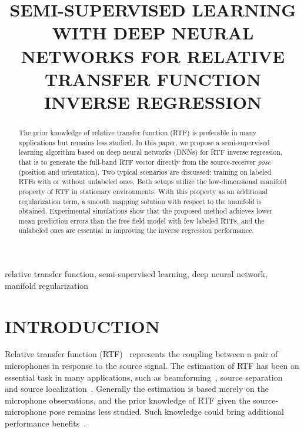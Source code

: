 \documentclass{article}
\title{SEMI-SUPERVISED LEARNING WITH DEEP NEURAL NETWORKS FOR RELATIVE TRANSFER FUNCTION INVERSE REGRESSION }
\begin{document}
\ninept
%
\maketitle
%
\begin{abstract}
The prior knowledge of relative transfer function (RTF) is preferable in many applications but remains less studied. In this paper, we propose a semi-supervised learning algorithm based on deep neural networks (DNNs) for RTF inverse regression, that is to generate the full-band RTF vector directly from the source-receiver \emph{pose} (position and orientation). Two typical scenarios are discussed: training on labeled RTFs with or without unlabeled ones. Both setups utilize the low-dimensional manifold property of RTF in stationary environments. With this property as an additional regularization term, a smooth mapping solution with respect to the manifold is obtained. Experimental simulations show that the proposed method achieves lower mean prediction errors than the free field model with few labeled RTFs, and the unlabeled ones are essential in improving the inverse regression performance.
\end{abstract}
%
\begin{keywords}
relative transfer function, semi-supervised learning, deep neural network, manifold regularization
\end{keywords}
%
\section{INTRODUCTION}
\label{sec:intro}


Relative transfer function (RTF)~\cite{gannot2001signal,cohen2004relative} represents the coupling between a pair of microphones in response to the source signal. The estimation of RTF has been an essential task in many applications, such as beamforming~\cite{talmon2009relative}, source separation~\cite{taseska2015relative} and  source localization~\cite{li2015estimation}. Generally the estimation is based merely on the microphone observations, and the prior knowledge of RTF given the source-microphone pose remains less studied. Such knowledge could bring additional performance benefits~\cite{talmon2013relative,koldovsky2013semi}.
\end{document}
